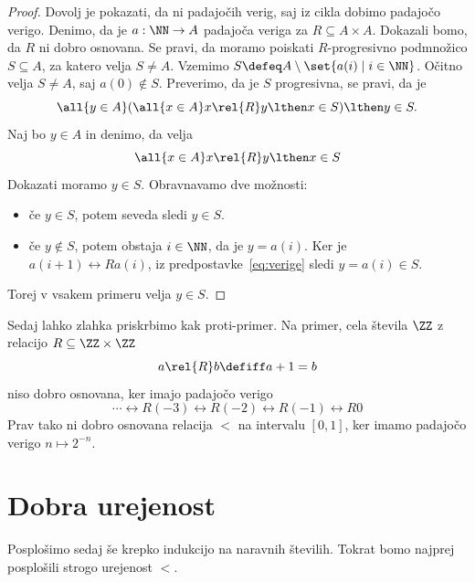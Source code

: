 \begin{proof}
  Dovolj je pokazati, da ni padajočih verig, saj iz cikla dobimo padajočo verigo.
  Denimo, da je $a : \NN \to A$ padajoča veriga za $R \subseteq A \times A$. Dokazali bomo, da $R$ ni dobro
  osnovana. Se pravi, da moramo poiskati $R$-progresivno podmnožico $S \subseteq A$, za katero velja
  $S \neq A$. Vzemimo $S \defeq A \setminus \set{ a(i) \mid i \in \NN}$. Očitno velja $S \neq A$, saj 
  $a(0) \not\in S$. Preverimo, da je $S$ progresivna, se pravi, da je
  \begin{equation*}
    \all{y \in A} (\all{x \in A} x \rel{R} y \lthen x \in S) \lthen y \in S.
  \end{equation*}
  Naj bo $y \in A$ in denimo, da velja
  \begin{equation}
    \label{eq:verige}
    \all{x \in A} x \rel{R} y \lthen x \in S
  \end{equation}
  Dokazati moramo $y \in S$. Obravnavamo dve možnosti:
  \begin{itemize}
  \item če $y \in S$, potem seveda sledi $y \in S$.
  \item če $y \not\in S$, potem obstaja $i \in \NN$, da je $y = a(i)$. Ker je $a(i+1) \rel{R} a(i)$, iz
    predpostavke~\eqref{eq:verige} sledi $y = a(i) \in S$.
  \end{itemize}
  Torej v vsakem primeru velja $y \in S$.
\end{proof}

\begin{zgled}
  Sedaj lahko zlahka priskrbimo kak proti-primer. Na primer, cela števila $\ZZ$ z relacijo $R \subseteq \ZZ \times \ZZ$
  \begin{equation*}
    a \rel{R} b \defiff a + 1 = b
  \end{equation*}
  niso dobro osnovana, ker imajo padajočo verigo
  \begin{equation*}
    \cdots \rel{R} (-3) \rel{R} (-2) \rel{R} (-1) \rel{R} 0
  \end{equation*}
  Prav tako ni dobro osnovana relacija $<$ na intervalu $[0,1]$, ker imamo padajočo verigo
  $n \mapsto 2^{-n}$.
\end{zgled}

\section{Dobra urejenost}

Posplošimo sedaj še krepko indukcijo na naravnih številih. Tokrat bomo najprej posplošili
strogo urejenost $<$.

